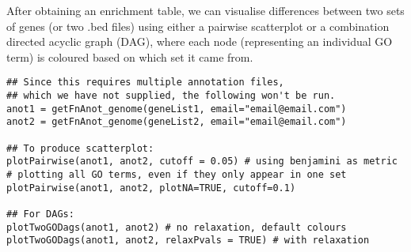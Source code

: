 \documentclass[11pt, oneside]{article}
\begin{document}
After obtaining an enrichment table, we can visualise differences between two sets of genes (or two .bed files) using either a pairwise scatterplot or a combination directed acyclic graph (DAG), where each node (representing an individual GO term) is coloured based on which set it came from.
\begin{verbatim}
## Since this requires multiple annotation files, 
## which we have not supplied, the following won't be run.
anot1 = getFnAnot_genome(geneList1, email="email@email.com")
anot2 = getFnAnot_genome(geneList2, email="email@email.com")

## To produce scatterplot:
plotPairwise(anot1, anot2, cutoff = 0.05) # using benjamini as metric
# plotting all GO terms, even if they only appear in one set
plotPairwise(anot1, anot2, plotNA=TRUE, cutoff=0.1) 

## For DAGs:
plotTwoGODags(anot1, anot2) # no relaxation, default colours
plotTwoGODags(anot1, anot2, relaxPvals = TRUE) # with relaxation
\end{verbatim}
\end{document}
